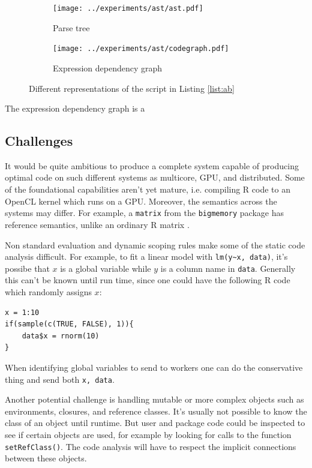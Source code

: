 \documentclass[12pt]{article}
\begin{document}


\begin{figure}
\centering
\begin{subfigure}{.6\textwidth}
    \centering
    \texttt{[image: ../experiments/ast/ast.pdf]}
    \caption{Parse tree}
    \label{fig:ast}
\end{subfigure}%
\begin{subfigure}{.4\textwidth}
  \centering
  \texttt{[image: ../experiments/ast/codegraph.pdf]}
  \caption{Expression dependency graph}
  \label{fig:codegraph}
\end{subfigure}
\caption{Different representations of the script in Listing \ref{list:ab}}
\end{figure}

The expression dependency graph is a 

\subsection{Challenges}

It would be quite ambitious to produce a complete system capable of
producing optimal code on such different systems as multicore, GPU, and
distributed. Some of the foundational capabilities aren't yet mature, i.e.
compiling R code to an OpenCL kernel which runs on a GPU. Moreover, the
semantics across the systems may differ. For example, a \texttt{matrix} from
the \texttt{bigmemory} package has reference semantics,
unlike an ordinary R matrix \cite{bigmemory}.

Non standard evaluation and dynamic scoping rules make some of the
static code analysis difficult. For example, to fit a linear model with
\texttt{lm(y\textasciitilde x, data)}, it's possibe that $x$ is a global variable while
$y$ is a column name in \texttt{data}. Generally this can't be known until
run time, since one could have the following R code which randomly assigns
$x$:

\begin{verbatim}
x = 1:10
if(sample(c(TRUE, FALSE), 1)){
    data$x = rnorm(10)
}
\end{verbatim}

When identifying global variables to send to workers one can do the
conservative thing and send both \texttt{x, data}.

Another potential challenge is handling mutable or more complex objects
such as environments, closures, and reference classes.  It's usually not
possible to know the class of an object until runtime. But user and package
code could be inspected to see if certain objects are used, for example by
looking for calls to the function \texttt{setRefClass()}.  The code
analysis will have to respect the implicit connections between these
objects.
\end{document}
